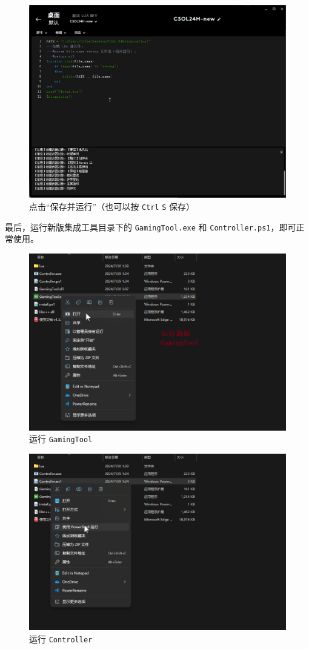 \begin{figure}[H]
    \Centering
    \includegraphics[width=\textwidth]{docs/assets/update/save_and_run_01.png}
    \caption{点击“保存并运行”（也可以按 \lstinline{Ctrl} \lstinline{S} 保存）}
\end{figure}

最后，运行新版集成工具目录下的 \lstinline{GamingTool.exe} 和 \lstinline{Controller.ps1}，即可正常使用。

\begin{figure}[H]
    \Centering
    \includegraphics[width=\textwidth]{docs/assets/update/run_new_gamingtool.png}
    \caption{运行 \lstinline{GamingTool}}
\end{figure}

\begin{figure}[H]
    \Centering
    \includegraphics[width=\textwidth]{docs/assets/update/run_new_controller.png}
    \caption{运行 \lstinline{Controller}}
\end{figure}
